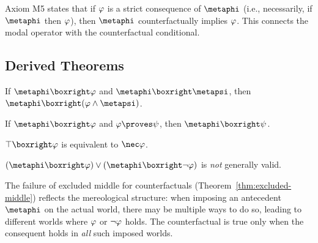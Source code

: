 \documentclass[../LogosReference.tex]{subfiles}
\begin{document}
\begin{remark}
	Axiom M5 states that if $\varphi$ is a strict consequence of $\metaphi$ (i.e., necessarily, if $\metaphi$ then $\varphi$), then $\metaphi$ counterfactually implies $\varphi$.
	This connects the modal operator with the counterfactual conditional.
\end{remark}


\subsection{Derived Theorems}\label{sec:derived-theorems}

\begin{theorem}\label{thm:cf-strengthening}
	If $\metaphi \boxright \metaA$ and $\metaphi \boxright \metapsi$, then $\metaphi \boxright (\metaA \land \metapsi)$.
\end{theorem}

\begin{theorem}\label{thm:cf-weakening}
	If $\metaphi \boxright \metaA$ and $\metaA \proves \metaB$, then $\metaphi \boxright \metaB$.
\end{theorem}

\begin{theorem}\label{thm:necessity-intro}
	$\top \boxright \metaA$ is equivalent to $\nec\metaA$.
\end{theorem}

\begin{theorem}\label{thm:excluded-middle}
	$(\metaphi \boxright \metaA) \lor (\metaphi \boxright \neg\metaA)$ is \emph{not} generally valid.
\end{theorem}

\begin{remark}
	The failure of excluded middle for counterfactuals (Theorem~\ref{thm:excluded-middle}) reflects the mereological structure: when imposing an antecedent $\metaphi$ on the actual world, there may be multiple ways to do so, leading to different worlds where $\varphi$ or $\neg\varphi$ holds.
	The counterfactual is true only when the consequent holds in \emph{all} such imposed worlds.
\end{remark}

\end{document}
